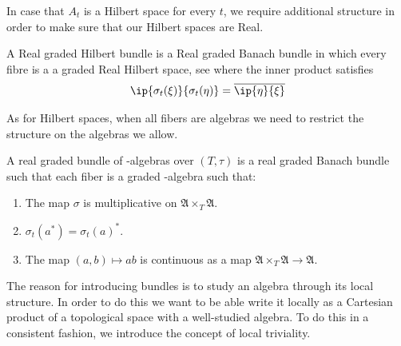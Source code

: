 In case that $A_t$ is a Hilbert space for every $t$, we require additional structure in order to make sure that our Hilbert spaces are Real. 
\begin{definition}
	A Real graded Hilbert bundle is a Real graded Banach bundle in which every fibre is a a graded Real Hilbert space, see  where the inner product satisfies 
	\begin{align*}
		\ip{\sigma_t(\xi)}{\sigma_t(\eta)}=\overline{\ip{\eta}{\xi}}
	\end{align*}
\end{definition}
As for Hilbert spaces, when all fibers are \Cstar algebras we need to restrict the structure on the \Cstar algebras we allow.
\begin{definition}
	 A real graded bundle of \Cstar-algebras over $(T,\tau)$ is a real graded Banach bundle such that each fiber is a graded \Cstar-algebra such that: 
	 \begin{enumerate}
	 \item
		The map $\sigma$ is multiplicative on $\mathfrak{A}\times_T \mathfrak{A}$. 
	 \item
		$\sigma_t(a^*)=\sigma_t(a)^*$.
	 \item
		The map $(a,b)\mapsto ab$ is continuous as a map $\mathfrak{A}\times_T \mathfrak{A}\to \mathfrak{A}$. 
	 \end{enumerate}
\end{definition}
The reason for introducing bundles is to study an algebra through its local structure. In order to do this we want to be able write it locally as a Cartesian product of a topological space with a well-studied algebra. To do this in a consistent fashion, we introduce the concept of local triviality. 
